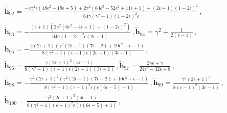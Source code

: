 \begin{align}
    \begin{split}
  &\boldsymbol{\tilde h}_{92}=\frac{-4 \gamma ^4 \epsilon  \left(18 \epsilon ^2-19 \epsilon +5\right)+2 \gamma ^2 \left(64 \epsilon ^3-52 \epsilon ^2+11 \epsilon +1\right)+(2 \epsilon +1) (1-2 \epsilon )^2}{64 \gamma  \left(\gamma ^2-1\right) (1-2 \epsilon )^2 \epsilon }\,,\\
   & \boldsymbol{\tilde h}_{93}=-\frac{(\epsilon +1) \left(2 \gamma ^2 \left(6 \epsilon ^2-4 \epsilon +1\right)+(1-2 \epsilon )^2\right)}{64 \gamma  (1-2 \epsilon )^2 \epsilon  (2 \epsilon +1)}\,, \boldsymbol{\tilde h}_{94}=\gamma ^2+\frac{1}{2 (\epsilon -1)}\,,\\&\boldsymbol{\tilde h}_{95}=-\frac{\gamma  (2 \epsilon +1) \left(\gamma ^2 (2 \epsilon -1) (7 \epsilon -2)+10 \epsilon ^2+\epsilon -1\right)}{8 \left(\gamma ^2-1\right) (\epsilon -1) \epsilon  (2 \epsilon -1) (3 \epsilon -1)}\,,\\&\boldsymbol{\tilde h}_{96}=\frac{\gamma  (2 \epsilon +1)^2 (4 \epsilon -1)}{8 \left(\gamma ^2-1\right) (\epsilon -1) \epsilon  (2 \epsilon -1) (3 \epsilon -1)}\,,\boldsymbol{\tilde h}_{97}=\frac{2 \gamma  \epsilon +\gamma }{24 \epsilon ^2-32 \epsilon +8}\,,\\&\boldsymbol{\tilde h}_{98}=-\frac{\gamma^2  (2 \epsilon +1)^2 \left(\gamma ^2 (2 \epsilon -1) (7 \epsilon -2)+10 \epsilon ^2+\epsilon -1\right)}{8 \left(\gamma ^2-1\right) (\epsilon -1)^2 \epsilon  (\epsilon  (6 \epsilon -5)+1)}\,,\boldsymbol{\tilde h}_{99}=\frac{\gamma^2  (2 \epsilon +1)^2}{8 (\epsilon -1)^2 (3 \epsilon -1)}\,,\\&\boldsymbol{\tilde h}_{100}=\frac{\gamma^2  (2 \epsilon +1)^3 (4 \epsilon -1)}{8 \left(\gamma ^2-1\right) (\epsilon -1)^2 \epsilon  (\epsilon  (6 \epsilon -5)+1)}\,,\\&

\end{split}
\end{align}
